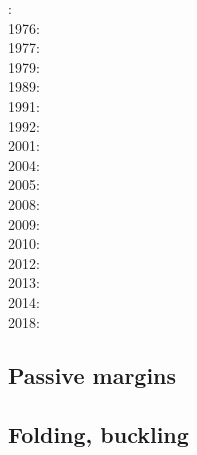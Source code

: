 {\scriptsize
{}: \cite{fouy75}\\
1976: \cite{riso76}\\
1977: \cite{chtu77}\\
1979: \cite{riso79}\\
1989: \cite{boww89}\\
1991: \cite{worg91}\\
1992: \cite{rich92}\cite{wuvr92}\cite{zoba92}\cite{clko92}\\
2001: \cite{stsm01}\\
2004: \cite{ligu04}\\
2005: \cite{timr05}\\
2008: \cite{bilr08}\cite{ghhw08}\\
2009: \cite{ghhf09}\cite{nacl09}\\
2010: \cite{bepo10}\\
2012: \cite{nalr12}\cite{ghho12}\\
2013: \cite{ghhw13}\cite{wagw13}\\
2014: \cite{vagw14}\\
2018: \cite{osss18}
}

\subsection{Passive margins} 

{\scriptsize
\noindent
\cite{clwv82}
\cite{lies86}
\cite{gebi05}
\cite{clbz08}
\cite{kasb08}
\cite{fasm10}
\cite{nigm10}
\cite{rapy11}
\cite{nigm11}
\cite{brfo11}
\cite{mana13}
\cite{yahb13}
\cite{macg14}
\cite{gebw15}
\cite{nigo15}
\cite{sahf18}
\cite{mube18}
\cite{tebu18}
\cite{zhli19}
}

\subsection{Folding, buckling} 

